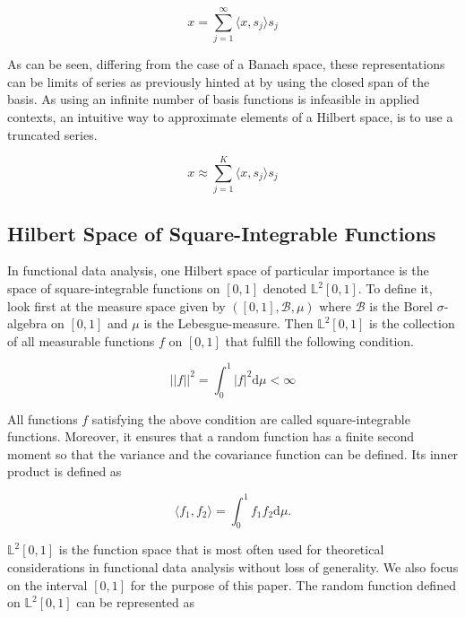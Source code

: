 \documentclass[11pt,twoside,a4paper]{article}
\begin{document}
	\begin{equation}
		x = \sum_{j = 1}^{\infty}{\langle x, s_j \rangle}s_j
	\end{equation}
	
	As can be seen, differing from the case of a Banach space, these representations can be limits of series as previously hinted at by using the closed span of the basis. As using an infinite number of basis functions is infeasible in applied contexts, an intuitive way to approximate elements of a Hilbert space, is to use a truncated series.
	
	\begin{equation}
		x \approx \sum_{j = 1}^{K}{\langle x, s_j \rangle}s_j
	\end{equation}
	
	\subsection{Hilbert Space of Square-Integrable Functions}
	In functional data analysis, one Hilbert space of particular importance is the space of square-integrable functions on $[0,1]$ denoted $\mathbb{L}^2[0,1]$. To define it, look first at the measure space given by $([0,1], \mathcal{B}, \mu)$ where $\mathcal{B}$ is the Borel $\sigma$-algebra on $[0,1]$ and $\mu$ is the Lebesgue-measure. Then $\mathbb{L}^2[0,1]$ is the collection of all measurable functions $f$ on $[0,1]$ that fulfill the following condition.
	
	\begin{equation}
		\lvert \lvert f \rvert \rvert^2 = \int_{0}^{1} \lvert f \rvert^2 \mathrm{d}\mu < \infty
	\end{equation}
	
	All functions $f$ satisfying the above condition are called square-integrable functions. Moreover, it ensures that a random function has a finite second moment so that the variance and the covariance function can be defined. Its inner product is defined as
	
	\begin{equation}
		\langle f_1, f_2 \rangle = \int_{0}^{1} f_1 f_2 \mathrm{d}\mu.
	\end{equation}
	
	 $\mathbb{L}^2[0,1]$ is the function space that is most often used for theoretical considerations in functional data analysis without loss of generality. We also focus on the interval $[0,1]$ for the purpose of this paper. The random function defined on $\mathbb{L}^2[0,1]$ can be represented as
	
\end{document}
